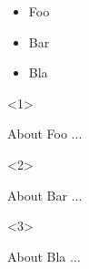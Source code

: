 \documentclass{beamer}
\begin{document}
\begin{frame}
  \begin{itemize}[<+->]
      \item Foo
      \item Bar
      \item Bla
  \end{itemize}
  \begin{onlyenv}<1>
      \begin{block}{About Foo}
        ...
      \end{block}
  \end{onlyenv}
  \begin{onlyenv}<2>
      \begin{block}{About Bar}
        ...
      \end{block}
  \end{onlyenv}
  \begin{onlyenv}<3>
      \begin{block}{About Bla}
        ...
      \end{block}
  \end{onlyenv}    
\end{frame}
\end{document}
